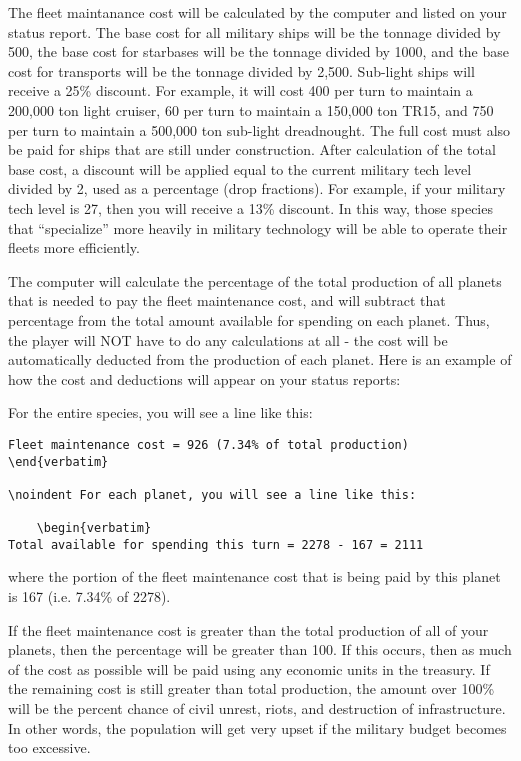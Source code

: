 \documentclass[10pt,titlepage]{article}
\begin{document}
The fleet maintanance cost will be calculated by the computer and listed on
your status report.  The base cost for all military ships will be the tonnage
divided by 500, the base cost for starbases will be the tonnage divided by
1000, and the base cost for transports will be the tonnage divided by 2,500.
Sub-light ships will receive a 25\% discount.  For example, it will cost 400
per turn to maintain a 200,000 ton light cruiser, 60 per turn to maintain a
150,000 ton TR15, and 750 per turn to maintain a 500,000 ton sub-light
dreadnought.  The full cost must also be paid for ships that are still under
construction.  After calculation of the total base cost, a discount will be
applied equal to the current military tech level divided by 2, used as a
percentage (drop fractions).  For example, if your military tech level is 27,
then you will receive a 13\% discount.  In this way, those species that
``specialize'' more heavily in military technology will be able to operate their
fleets more efficiently.

The computer will calculate the percentage of the total production of all
planets that is needed to pay the fleet maintenance cost, and will subtract
that percentage from the total amount available for spending on each planet.
Thus, the player will NOT have to do any calculations at all - the cost will be
automatically deducted from the production of each planet.  Here is an example
of how the cost and deductions will appear on your status reports:

\noindent For the entire species, you will see a line like this:

	\begin{verbatim}
Fleet maintenance cost = 926 (7.34% of total production)	\end{verbatim} 

\noindent For each planet, you will see a line like this:

	\begin{verbatim}
Total available for spending this turn = 2278 - 167 = 2111	\end{verbatim} 

where the portion of the fleet maintenance cost that is being paid by this
planet is 167 (i.e. 7.34\% of 2278).

If the fleet maintenance cost is greater than the total production of all of
your planets, then the percentage will be greater than 100.  If this occurs,
then as much of the cost as possible will be paid using any economic units in
the treasury.  If the remaining cost is still greater than total production,
the amount over 100\% will be the percent chance of civil unrest, riots, and
destruction of infrastructure.  In other words, the population will get very
upset if the military budget becomes too excessive.
\end{document}
